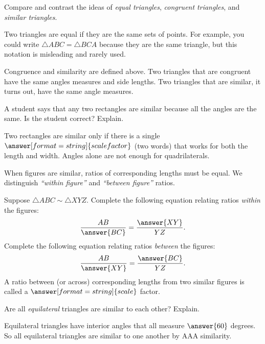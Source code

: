 \documentclass[nooutcomes]{ximera}
\begin{document}
\begin{question}
Compare and contrast the ideas of \textit{equal triangles},
  \textit{congruent triangles}, and \textit{similar triangles}.
\begin{freeResponse}
\end{freeResponse}
\begin{hint}
Two triangles are equal if they are the same sets of points.  For example, you could write $\triangle ABC = \triangle BCA$ because they are the same triangle, but this notation is misleading and rarely used.  

Congruence and similarity are defined above.  Two triangles that are congruent have the same angles measures and side lengths.  Two triangles that are similar, it turns out, have the same angle measures.  
\end{hint}
\end{question}

\begin{question}
A student says that any two rectangles are similar because all the angles are the same.  Is the student correct?  
 Explain. 
\begin{question}
Two rectangles are similar only if there is a single $\answer[format=string]{scale factor}$ (two words) that works for both the length and width.  Angles alone are not enough for quadrilaterals.  
\end{question}
\end{question}

\begin{question}When figures are similar, ratios of corresponding lengths must be equal.  We distinguish \emph{``within figure''} and \emph{``between figure''} ratios.  
 
Suppose $\triangle ABC \sim \triangle XYZ$.  Complete the following equation relating ratios \emph{within} the figures: 
\[
\frac{AB}{\answer{BC}} = \frac{\answer{XY}}{YZ}.  
\]
Complete the following equation relating ratios \emph{between} the figures: 
\[
\frac{AB}{\answer{XY}} = \frac{\answer{BC}}{YZ}.  
\]
A ratio between (or across) corresponding lengths from two similar figures is 
called a $\answer[format=string]{scale}$ factor.  
\end{question}


\begin{question}
Are all \emph{equilateral} triangles are similar to each other?  
 Explain.  
\begin{question}
Equilateral triangles have interior angles that all measure $\answer{60}$ degrees.  So all equilateral triangles are similar to one another by AAA similarity.  
\end{question}
\end{question}
\end{document}
